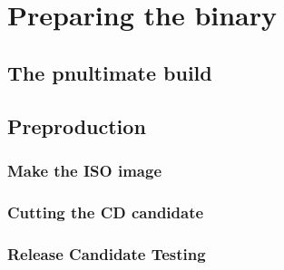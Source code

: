 \section{Preparing the binary}
\subsection{The pnultimate build}
\subsection{Preproduction}
\subsubsection{Make the ISO image}
\subsubsection{Cutting the CD candidate}
\subsubsection{Release Candidate Testing}

